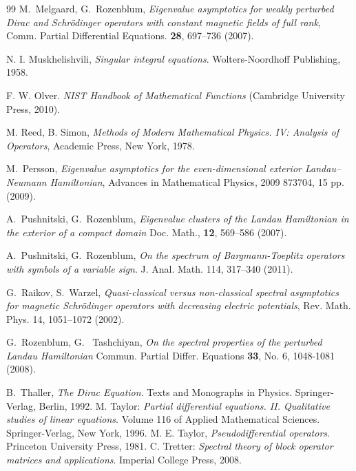 \documentclass[11pt,a4paper,reqno,oneside]{amsproc}
\numberwithin{equation}{section}
\begin{document}
\begin{thebibliography}{99}
  M.~Melgaard, G.~Rozenblum, \emph{Eigenvalue asymptotics for weakly perturbed Dirac and Schr\"odinger operators with constant magnetic fields of full rank}, Comm. Partial Differential Equations. {\bf 28},  697--736 (2007).

 N. I. Muskhelishvili, \emph{Singular integral equations}. Wolters-Noordhoff Publishing, 1958.


  F. W. Olver. {\em NIST Handbook of Mathematical Functions} (Cambridge University Press, 2010).

 M. Reed, B. Simon, {\em Methods of Modern Mathematical Physics. IV: Analysis of Operators}, Academic Press, New York, 1978. 

   M.~Persson, {\it  Eigenvalue asymptotics for the even-dimensional exterior Landau--Neumann Hamiltonian}, Advances in Mathematical Physics,  {2009} 873704, 15 pp. (2009).		
 
 A.~Pushnitski, G.~Rozenblum, {\em  Eigenvalue clusters of the Landau Hamiltonian in the exterior of a compact domain} Doc. Math., {\bf 12}, 569--586 (2007).

  A.~Pushnitski, G.~Rozenblum, {\em  On the spectrum of Bargmann-Toeplitz operators with symbols of a variable sign}. 
	J. Anal. Math. {114}, 317--340 (2011).






 G.~Raikov, S.~Warzel, {\em Quasi-classical versus non-classical spectral asymptotics for magnetic {S}chr\"odinger operators with decreasing electric
  potentials}, Rev. Math. Phys. {\bf} 14, 1051--1072 (2002).
  
       G.~Rozenblum, G. ~Tashchiyan, {\em On the spectral properties of the perturbed Landau Hamiltonian} Commun. Partial Differ. Equations {\bf 33}, No. 6, 1048-1081 (2008). 

 B.~Thaller, {\em The Dirac Equation}. Texts and Monographs in Physics. Springer-Verlag, Berlin, 1992.
 M. Taylor: {\em Partial differential equations. II. Qualitative studies of linear equations}.  Volume 116 of Applied Mathematical Sciences. Springer-Verlag, New York, 1996.
 M. E. Taylor, \emph{Pseudodifferential operators}. Princeton University Press, 1981.
 C. Tretter: {\em Spectral theory of block operator matrices and applications}. Imperial College Press, 2008.

\end{thebibliography}
\end{document}
